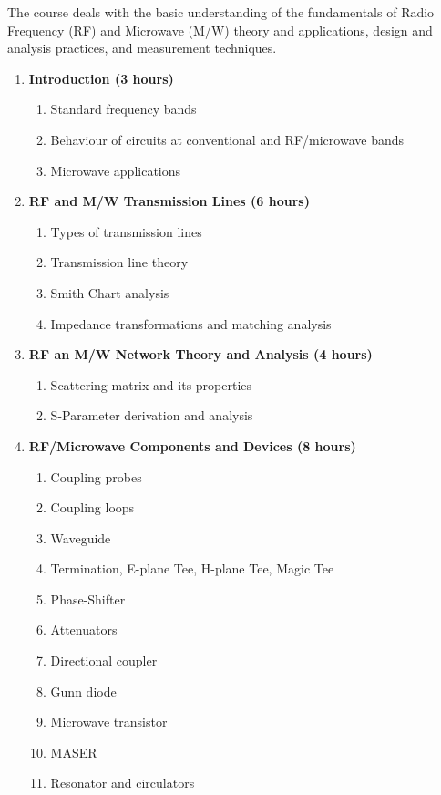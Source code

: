 
\cobjectives
  The course deals with the basic understanding of the fundamentals of Radio Frequency (RF) and Microwave (M/W) theory and applications, design and analysis practices, and measurement techniques.
  \VS

\begin{enumerate}
  \item \textbf{Introduction \hfill (3 hours)}
    \begin{enumerate}
      \item Standard frequency bands
      \item Behaviour of circuits at conventional and RF/microwave bands
      \item Microwave applications
    \end{enumerate}
    \vs

  \item \textbf{RF and M/W Transmission Lines \hfill (6 hours)}
    \begin{enumerate}
      \item Types of transmission lines
      \item Transmission line theory
      \item Smith Chart analysis
      \item Impedance transformations and matching analysis
    \end{enumerate}
    \vs

  \item \textbf{RF an M/W Network Theory and Analysis \hfill (4 hours)}
    \begin{enumerate}
      \item Scattering matrix and its properties
      \item S-Parameter derivation and analysis
    \end{enumerate}
    \vs

  \item \textbf{RF/Microwave Components and Devices \hfill (8 hours)}
    \begin{enumerate}
      \item Coupling probes
      \item Coupling loops
      \item Waveguide
      \item Termination, E-plane Tee, H-plane Tee, Magic Tee
      \item Phase-Shifter
      \item Attenuators
      \item Directional coupler
      \item Gunn diode
      \item Microwave transistor
      \item MASER
      \item Resonator and circulators
    \end{enumerate}
    \vs


\end{enumerate}
